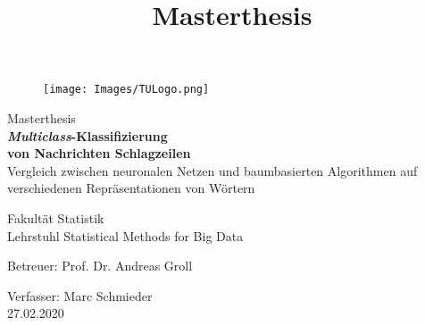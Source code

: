\documentclass[a4paper,11pt]{article}
\begin{document}
\begin{titlepage}

\vspace*{3cm}


\begin{figure}[t]
\begin{flushright}
\texttt{[image: Images/TULogo.png]}


\end{flushright}
\end{figure}
\vspace*{3cm}


\begin{center}

\vspace*{2cm}

\title{Masterthesis}



{\huge Masterthesis}\\
 {\huge{\textbf{\textit{Multiclass}-Klassifizierung \\
 von Nachrichten Schlagzeilen}}\\}
 \vspace{0.2cm}
 {\large  Vergleich zwischen neuronalen Netzen und baumbasierten Algorithmen auf verschiedenen Repräsentationen von Wörtern\\}
\vspace*{4cm}


{\large  Fakultät Statistik\\
Lehrstuhl Statistical Methods for Big Data }
\vspace*{0.5cm}

 \begin{large}
 Betreuer: Prof. Dr. Andreas Groll\\
  \end{large}

  \begin{large}
Verfasser: Marc Schmieder\\
27.02.2020\\
   \vspace*{2cm}

 \end{large}
\end{center}

\thispagestyle{empty}
\tableofcontents
\newpage

\label{sec:abkuerz}
\vspace{1cm}


\end{titlepage}
\end{document}
